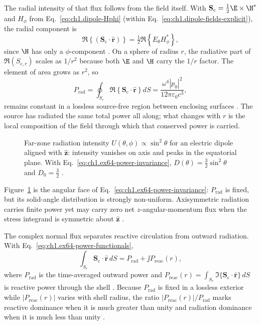 The radial intensity of that flux follows from the field itself. With
$\mathbf{S}_\mathrm{c}=\tfrac12\E\times\H^*$ and $H_\phi$ from
Eq.~\eqref{eq:ch1.dipole-Hphi} (within Eq.~\eqref{eq:ch1.dipole-fields-explicit}), the radial component is
\begin{equation}
\label{eq:ch1.dipole-sc-radial}
\Re\!\left\{(\mathbf{S}_\mathrm{c}\cdot\hat{\mathbf{r}})\right\}
=\tfrac12\Re\!\left\{E_\theta H_\phi^*\right\},
\end{equation}
since $\H$ has only a $\phi$-component \cite{stratton1941}.
On a sphere of radius $r$, the radiative part of $\Re(S_{\mathrm{c},r})$ scales as $1/r^2$ because both $\E$ and $\H$ carry the $1/r$ factor. The element of area grows as $r^2$, so
\begin{equation}
\label{eq:ch1.ex64-power-invariance}
P_{\mathrm{rad}}=\oint_{S_r}\Re\!\left\{\mathbf{S}_\mathrm{c}\cdot\hat{\mathbf{r}}\right\}dS
=\frac{\omega^4|p_0|^2}{12\pi\varepsilon_0 c^3},
\end{equation}
remains constant in a lossless source-free region between enclosing surfaces \cite{stratton1941}. The source has radiated the same total power all along; what changes with $r$ is the local composition of the field through which that conserved power is carried.

\begin{figure}[t]
\centering
\VolIPhysFig{\VolIPhysDipoleRadiationPattern}
\caption{Far-zone radiation intensity $U(\theta,\phi)\propto\sin^2\theta$ for an electric dipole aligned with $\hat{\mathbf{z}}$: intensity vanishes on axis and peaks in the equatorial plane. With Eq.~\eqref{eq:ch1.ex64-power-invariance}, $D(\theta)=\tfrac32\sin^2\theta$ and $D_0=\tfrac32$ \cite{stratton1941,harrington2001}.}
\label{fig:ch1.dipole-radiation-pattern}
\end{figure}

Figure~\ref{fig:ch1.dipole-radiation-pattern} is the angular face of Eq.~\eqref{eq:ch1.ex64-power-invariance}: $P_{\mathrm{rad}}$ is fixed, but its solid-angle distribution is strongly non-uniform. Axisymmetric radiation carries finite power yet may carry zero net $z$-angular-momentum flux when the stress integrand is symmetric about $\hat{\mathbf{z}}$ \cite{beth1936}.

The complex normal flux separates reactive circulation from outward radiation. With Eq.~\eqref{eq:ch1.ex64-power-functionals},
\begin{equation}
\label{eq:ch1.ex64-complex-power}
\int_{S_r}\mathbf{S}_\mathrm{c}\cdot\hat{\mathbf{r}}\,dS=P_{\mathrm{rad}}+\jj P_{\mathrm{reac}}(r),
\end{equation}
where $P_{\mathrm{rad}}$ is the time-averaged outward power and $P_{\mathrm{reac}}(r)=\int_{S_r}\Im\{\mathbf{S}_\mathrm{c}\cdot\hat{\mathbf{r}}\}\,dS$ is reactive power through the shell \cite{poynting1884}. Because $P_{\mathrm{rad}}$ is fixed in a lossless exterior while $|P_{\mathrm{reac}}(r)|$ varies with shell radius, the ratio $|P_{\mathrm{reac}}(r)|/P_{\mathrm{rad}}$ marks reactive dominance when it is much greater than unity and radiation dominance when it is much less than unity \cite{stratton1941}.

